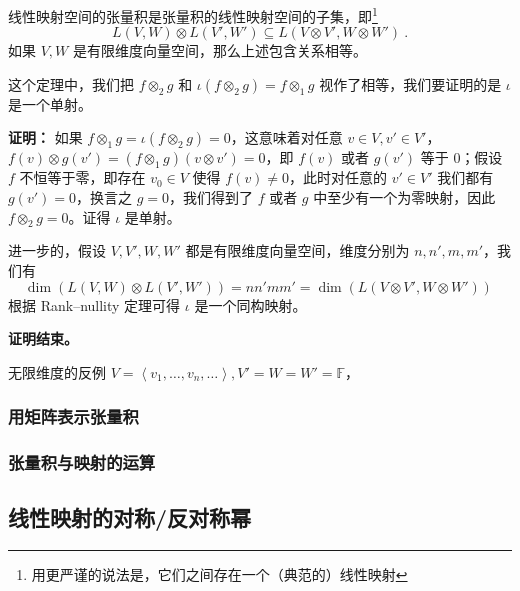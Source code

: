 \begin{theorem}{}
线性映射空间的张量积是张量积的线性映射空间的子集，即\footnote{用更严谨的说法是，它们之间存在一个（典范的）线性映射}
\begin{equation}
L(V, W) \otimes L(V', W') \subseteq L(V \otimes V', W \otimes W')~.
\end{equation}
如果 $V, W$ 是有限维度向量空间，那么上述包含关系相等。
\end{theorem}

这个定理中，我们把 $f \otimes_2 g$ 和 $\iota(f \otimes_2 g) = f \otimes_1 g$ 视作了相等，我们要证明的是 $\iota$ 是一个单射。

\textbf{证明：}
如果 $f \otimes_1 g = \iota(f \otimes_2 g) = 0$，这意味着对任意 $v \in V, v' \in V'$，$f(v) \otimes g(v') = (f \otimes_1 g)(v \otimes v') = 0$，即 $f(v)$ 或者 $g(v')$ 等于 $0$；假设 $f$ 不恒等于零，即存在 $v_0 \in V$ 使得 $f(v) \neq 0$，此时对任意的 $v' \in V'$ 我们都有 $g(v') = 0$，换言之 $g = 0$，我们得到了 $f$ 或者 $g$ 中至少有一个为零映射，因此 $f \otimes_2 g = 0$。证得 $\iota$ 是单射。

进一步的，假设 $V, V', W, W'$ 都是有限维度向量空间，维度分别为 $n, n', m, m'$，我们有
\begin{equation}
\dim(L(V, W) \otimes L(V', W')) = n n' m m' = \dim(L(V \otimes V', W \otimes W'))~
\end{equation}
根据 Rank–nullity 定理可得 $\iota$ 是一个同构映射。

\textbf{证明结束。}

\begin{example}{无限维度的反例}
$V = \left\langle v_1, \dots, v_n, \dots \right\rangle, V' = W = W' = \mathbb{F}$，
\end{example}

\subsubsection{用矩阵表示张量积}


\subsubsection{张量积与映射的运算}



\subsection{线性映射的对称/反对称幂}




